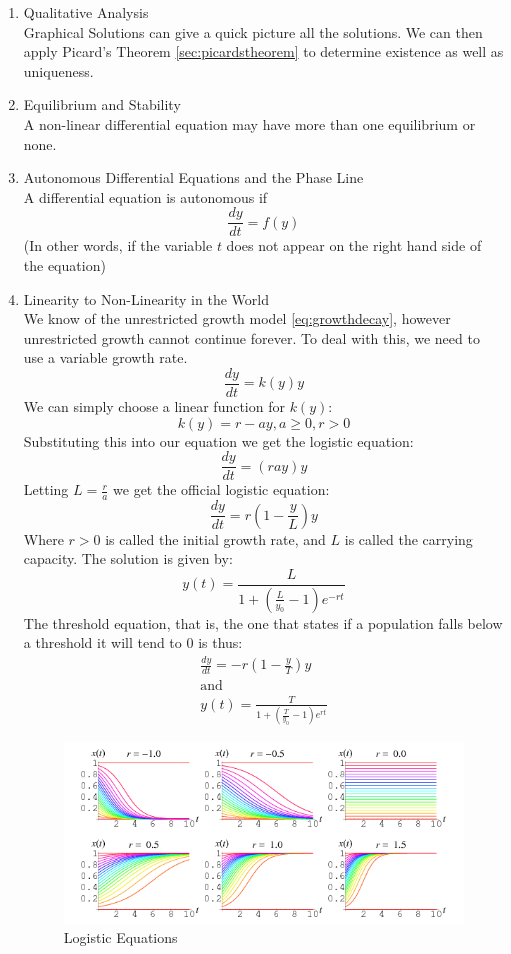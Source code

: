 \begin{enumerate}
\item Qualitative Analysis\\
Graphical Solutions can give a quick picture all the solutions. We can then apply Picard's Theorem \eqref{sec:picardstheorem} to determine existence as well as uniqueness.
\item Equilibrium and Stability\\
A non-linear differential equation may have more than one equilibrium or none.
\item Autonomous Differential Equations and the Phase Line\\
A differential equation is autonomous if
    \[
    \frac{dy}{dt} = f(y)
    \]
(In other words, if the variable $t$ does not appear on the right hand side of the equation)
\item Linearity to Non-Linearity in the World\\
We know of the unrestricted growth model \eqref{eq:growthdecay}, however unrestricted growth cannot continue forever. To deal with this, we need to use a variable growth rate.
    \[
    \frac{dy}{dt} = k(y) y
    \]
We can simply choose a linear function for $k(y)$:
    \[
    k(y) = r - ay, a \ge 0, r > 0
    \]
Substituting this into our equation we get the logistic equation:
    \[
    \frac{dy}{dt} = (r ay) y
    \]
Letting $L=\frac{r}{a}$ we get the official logistic equation:
    \[
    \frac{dy}{dt} = r \left( 1 - \frac{y}{L} \right) y
    \]
Where $r > 0$ is called the initial growth rate, and $L$ is called the carrying capacity. The solution is given by:
    \[
    y(t) = \frac{L}{1 + \left( \frac{L}{y_0} - 1 \right) e^{-rt} }
    \]
The threshold equation, that is, the one that states if a population falls below a threshold it will tend to $0$ is thus:
\[
\begin{aligned}
\frac{dy}{dt} = -r \left( 1 - \frac{y}{T} \right) y\\
\text{and}\\
y(t) = \frac{T}{1 + \left( \frac{T}{y_0} - 1 \right) e^{rt} }
\end{aligned}
\]

\begin{figure}[h!]\label{fig:logeq}
    \centering
        \includegraphics[scale=0.5]{./img/LogisticEquation.png}
    \caption{Logistic Equations}
\end{figure}

\end{enumerate}

